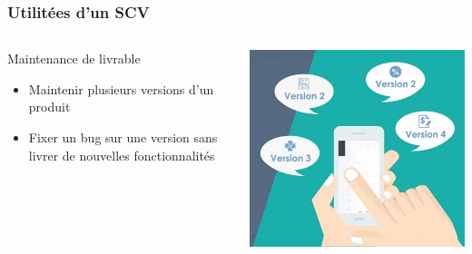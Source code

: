 \documentclass{beamer}
\begin{document}
\begin{frame}
\frametitle{Utilitées d'un SCV}
\begin{columns}[T]
\begin{column}{.7\textwidth}
\begin{block}{Maintenance de livrable}
\begin{itemize}
\item Maintenir plusieurs versions d’un produit
\item Fixer un bug sur une version sans livrer de nouvelles fonctionnalités
\end{itemize}
\end{block}
\end{column}

\begin{column}{.3\textwidth}
 \includegraphics[width=\textwidth]{../images/livrable.jpg}
\end{column}
\end{columns}
\end{frame}


\end{document}
